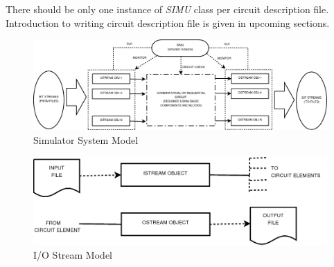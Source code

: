 \documentclass[a4paper,12pt]{article}
\begin{document}
 There should be only one instance of \emph{SIMU} class per circuit description file. Introduction to writing circuit description file is given in upcoming sections. 

\begin{figure}[!h]
   \begin{center}
   \includegraphics[scale=0.25]{syst_model.png}
    \caption{{Simulator System Model}}
  \label{syst_model}
  \end{center}
  \end{figure}


\begin{figure}[!h]
   \begin{center}
   \includegraphics[scale=0.3]{iostream.png}
    \caption{{I/O Stream Model}}
  \label{iostream}
  \end{center}
  \end{figure}
 
\end{document}
